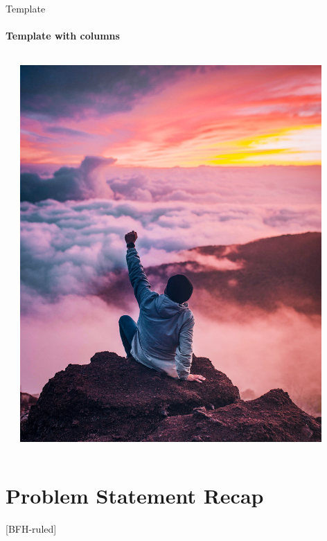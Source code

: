 \documentclass[
    ngerman,%
    authorontitle=true,
]{bfhbeamer}
\begin{document}
	    \begin{frame}{Template}
		\framesubtitle{Template with columns}
		\begin{columns} %
			\begin{column}{0.7\textwidth} %
				
			\end{column}
			\begin{column}{0.3\textwidth} %
				\begin{center}
					\includegraphics[width=0.9\textwidth]{pictures/final_presentation/achievement.jpg}
				\end{center}
			\end{column}
		\end{columns}
		
	\end{frame}



    \section{Problem Statement Recap}
    [BFH-ruled]
    \frame{\sectionpage}
    
\end{document}
